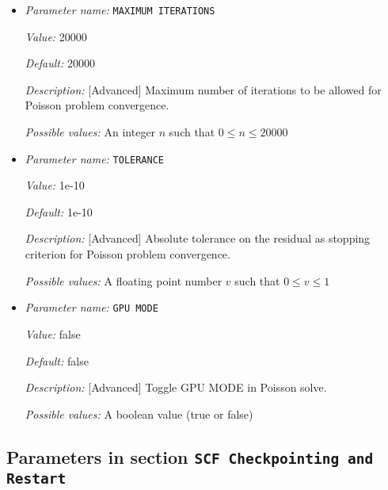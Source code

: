 \begin{itemize}
\item {\it Parameter name:} {\tt MAXIMUM ITERATIONS}
\label{parameters:Poisson problem parameters/MAXIMUM ITERATIONS}
\label{parameters:Poisson_20problem_20parameters/MAXIMUM_20ITERATIONS}


{\it Value:} 20000


{\it Default:} 20000


{\it Description:} [Advanced] Maximum number of iterations to be allowed for Poisson problem convergence.


{\it Possible values:} An integer $n$ such that $0\leq n \leq 20000$
\item {\it Parameter name:} {\tt TOLERANCE}
\label{parameters:Poisson problem parameters/TOLERANCE}
\label{parameters:Poisson_20problem_20parameters/TOLERANCE}


{\it Value:} 1e-10


{\it Default:} 1e-10


{\it Description:} [Advanced] Absolute tolerance on the residual as stopping criterion for Poisson problem convergence.


{\it Possible values:} A floating point number $v$ such that $0 \leq v \leq 1$
\item {\it Parameter name:} {\tt GPU MODE}
\label{parameters:Poisson problem parameters/GPU MODE}
\label{parameters:Poisson_20problem_20parameters/GPU MODE}


{\it Value:} false


{\it Default:} false


{\it Description:} [Advanced] Toggle GPU MODE in Poisson solve.


{\it Possible values:}  A boolean value (true or false)
\end{itemize}

\subsection{Parameters in section \tt SCF Checkpointing and Restart}
\label{parameters:SCF_20Checkpointing_20and_20Restart}

